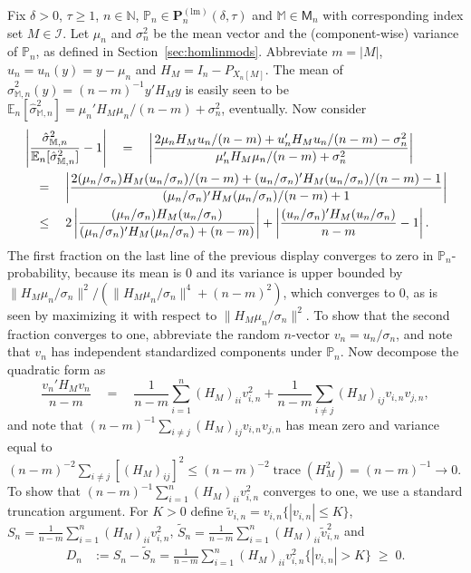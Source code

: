 \documentclass[preprint]{imsart}
\newcommand{\E}{{\mathbb E}}
\renewcommand{\P}{{\mathbb P}}
\newcommand{\N}{{\mathbb N}}
\newcommand{\M}{\mathbb M}
\DeclareMathOperator{\trace}{trace}
\numberwithin{equation}{section}
\begin{document}
Fix $\delta>0$, $\tau\ge1$, $n\in\N$, $\P_n\in\mathbf{P}_n^{(\mathrm{lm})}(\delta,\tau)$ and $\M\in\mathsf{M}_n$ with corresponding index set $M\in\mathcal I$. Let $\mu_n$ and $\sigma_n^2$ be the mean vector and the (component-wise) variance of $\P_n$, as defined in Section~\ref{sec:homlinmods}. Abbreviate $m = |M|$, $u_n = u_n(y) = y - \mu_n$ and $H_M = I_n-P_{X_n[M]}$. The mean of $\hat{\sigma}_{\M,n}^2(y) = (n-m)^{-1} y'H_My$ is easily seen to be
$\E_n[\hat{\sigma}_{\M,n}^2] = \mu_n'H_M\mu_n/(n-m) + \sigma_n^2$, eventually.
Now consider
\begin{align}
&\left|\frac{\hat{\sigma}_{\M,n}^2}{\E_n[\hat{\sigma}_{\M,n}^2]} - 1\right|
\quad=\quad
\left|\frac{2\mu_nH_M u_n/(n-m) + u_n'H_M u_n/(n-m) - \sigma_n^2}{\mu_n' H_M \mu_n/(n-m) + \sigma_n^2}\right|\notag\\
&\quad=\quad
\left|\frac{2(\mu_n/\sigma_n)H_M (u_n/\sigma_n)/(n-m) + (u_n/\sigma_n)'H_M (u_n/\sigma_n)/(n-m) - 1}{(\mu_n/\sigma_n)' H_M (\mu_n/\sigma_n)/(n-m) + 1}\right|\notag\\
&\quad\le\quad
2\left|\frac{(\mu_n/\sigma_n)H_M (u_n/\sigma_n)}{(\mu_n/\sigma_n)'H_M (\mu_n/\sigma_n) + (n-m)}\right| +
\left| \frac{(u_n/\sigma_n)'H_M (u_n/\sigma_n)}{n-m} - 1\right|. \label{eq:prop:ConservativeLinMod}
\end{align}
The first fraction on the last line of the previous display converges to zero in $\P_n$-probability, because its mean is $0$ and its variance is upper bounded by $\|H_M \mu_n/\sigma_n\|^2/( \|H_M \mu_n/\sigma_n\|^4 + (n-m)^2 ) $, which converges to $0$, as is seen by maximizing it with respect to $\|H_M \mu_n/\sigma_n\|^2$. To show that the second fraction converges to one, abbreviate the random $n$-vector $v_n = u_n/\sigma_n$, and note that $v_n$ has independent standardized components under $\P_n$. Now decompose the quadratic form as
$$
\frac{v_n'H_Mv_n}{n-m} \quad=\quad \frac{1}{n-m}\sum_{i=1}^n (H_M)_{ii} v_{i,n}^2 + \frac{1}{n-m}\sum_{i\ne j} (H_M)_{ij} v_{i,n}v_{j,n},
$$
and note that $(n-m)^{-1}\sum_{i\ne j} (H_M)_{ij} v_{i,n}v_{j,n}$ has mean zero and variance equal to $(n-m)^{-2}\sum_{i\ne j} [(H_M)_{ij}]^2\le (n-m)^{-2}\trace(H_M^2) = (n-m)^{-1}\to0$. To show that $(n-m)^{-1}\sum_{i=1}^n (H_M)_{ii} v_{i,n}^2$ converges to one, we use a standard truncation argument. For $K>0$ define $\tilde{v}_{i,n} = v_{i,n}\{|v_{i,n}|\le K\}$, $S_n = \frac{1}{n-m}\sum_{i=1}^n(H_M)_{ii} v_{i,n}^2$, $\tilde{S}_n = \frac{1}{n-m}\sum_{i=1}^n(H_M)_{ii} \tilde{v}_{i,n}^2$ and
\begin{align*}
D_n &:= S_n - \tilde{S}_n 
=
\frac{1}{n-m}\sum_{i=1}^n(H_M)_{ii} v_{i,n}^2\{|v_{i,n}|>K\} \;\ge\; 0.
\end{align*}
\end{document}
